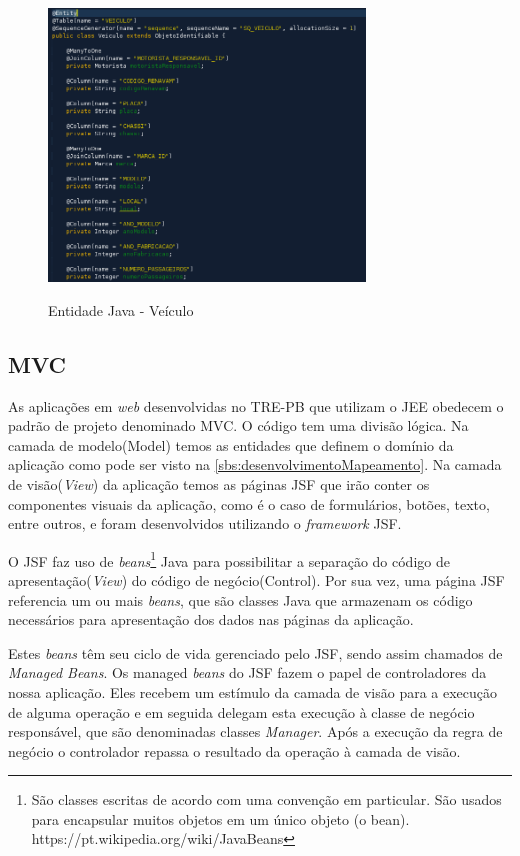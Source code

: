 \begin{figure}[!htb]
    \centering
    \caption{Entidade Java - Veículo}
    \includegraphics[width=0.75\textwidth]{dados/figuras/entidade.png}
    \label{fig:figura-entidade}
\end{figure}

\subsection{MVC}
\label{sbs:desenvolvimentoMVC}

As aplicações em \textit{web} desenvolvidas no TRE-PB que utilizam o JEE obedecem o padrão de projeto denominado MVC. O código tem uma divisão lógica. 
Na camada de modelo(Model) temos as entidades que definem o domínio da aplicação como pode ser visto na \autoref{sbs:desenvolvimentoMapeamento}. 
Na camada de visão(\textit{View}) da aplicação temos as páginas JSF que irão conter os componentes visuais da aplicação, como é o caso de formulários, botões, texto, entre outros, e foram desenvolvidos utilizando o \textit{framework} JSF. 

O JSF faz uso de \textit{beans}\footnote{São classes escritas de acordo com uma convenção em particular. São usados para encapsular muitos objetos em um único objeto (o bean). https://pt.wikipedia.org/wiki/JavaBeans} Java para possibilitar a separação do código de apresentação(\textit{View}) do código de negócio(Control). Por sua vez, uma página JSF referencia um ou mais \textit{beans}, que são classes Java que armazenam os código necessários para apresentação dos dados nas páginas da aplicação. 

Estes \textit{beans} têm seu ciclo de vida gerenciado pelo JSF, sendo assim chamados de \textit{Managed Beans}.
Os managed \textit{beans} do JSF fazem o papel de controladores da nossa aplicação. Eles recebem um estímulo da camada de visão para a execução de alguma operação e em seguida delegam esta execução à classe de negócio responsável, que são denominadas classes \textit{Manager}. Após a execução da regra de negócio o controlador repassa o resultado da operação à camada de visão.

